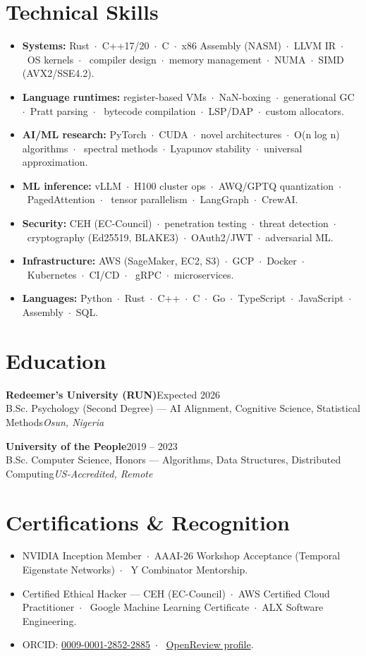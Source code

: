 \documentclass[10pt,a4paper]{article}
\newcommand{\sep}{\ $\cdot$\ }
\newcommand{\role}[4]{%
  \vspace{2pt}%
  {\bfseries #1}\hfill{\color{muted}#3}\\[1pt]%
  {\color{accent}#2}\hfill{\color{muted}\itshape #4}\par%
  \vspace{2pt}%
}
\begin{document}
\section{Technical Skills}
\begin{itemize}
  \item \textbf{Systems:} Rust\sep C++17/20\sep C\sep x86 Assembly (NASM)\sep LLVM IR\sep OS kernels\sep
        compiler design\sep memory management\sep NUMA\sep SIMD (AVX2/SSE4.2).
  \item \textbf{Language runtimes:} register-based VMs\sep NaN-boxing\sep generational GC\sep Pratt parsing\sep
        bytecode compilation\sep LSP/DAP\sep custom allocators.
  \item \textbf{AI/ML research:} PyTorch\sep CUDA\sep novel architectures\sep O(n log n) algorithms\sep
        spectral methods\sep Lyapunov stability\sep universal approximation.
  \item \textbf{ML inference:} vLLM\sep H100 cluster ops\sep AWQ/GPTQ quantization\sep PagedAttention\sep
        tensor parallelism\sep LangGraph\sep CrewAI.
  \item \textbf{Security:} CEH (EC-Council)\sep penetration testing\sep threat detection\sep cryptography
        (Ed25519, BLAKE3)\sep OAuth2/JWT\sep adversarial ML.
  \item \textbf{Infrastructure:} AWS (SageMaker, EC2, S3)\sep GCP\sep Docker\sep Kubernetes\sep CI/CD\sep
        gRPC\sep microservices.
  \item \textbf{Languages:} Python\sep Rust\sep C++\sep C\sep Go\sep TypeScript\sep JavaScript\sep
        Assembly\sep SQL.
\end{itemize}

\section{Education}
\role{Redeemer's University (RUN)}{B.Sc. Psychology (Second Degree) --- AI Alignment, Cognitive Science, Statistical Methods}{Expected 2026}{Osun, Nigeria}
\role{University of the People}{B.Sc. Computer Science, Honors --- Algorithms, Data Structures, Distributed Computing}{2019 -- 2023}{US-Accredited, Remote}

\section{Certifications \& Recognition}
\begin{itemize}
  \item NVIDIA Inception Member\sep AAAI-26 Workshop Acceptance (Temporal Eigenstate Networks)\sep
        Y Combinator Mentorship.
  \item Certified Ethical Hacker --- CEH (EC-Council)\sep AWS Certified Cloud Practitioner\sep
        Google Machine Learning Certificate\sep ALX Software Engineering.
  \item ORCID: \href{https://orcid.org/0009-0001-2852-2885}{0009-0001-2852-2885}\sep
        \href{https://openreview.net/profile?id=~Oluwatosin_Abioye_Afolabi2}{OpenReview profile}.
\end{itemize}
\end{document}
